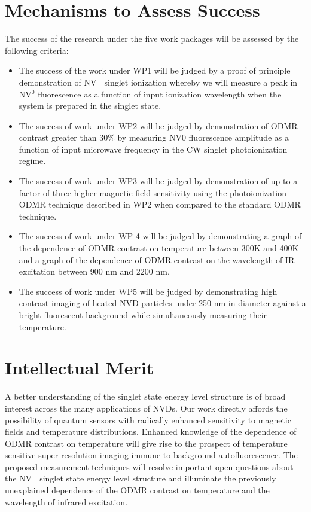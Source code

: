 \documentclass[11pt]{article}
\begin{document}
\section{Mechanisms to Assess Success}
The success of the research under the five work packages will be assessed by the following criteria:
\begin{itemize}
\item The success of the work under WP1 will be judged by a proof of principle demonstration of NV$^-$ singlet ionization whereby we will measure a peak in NV$^0$ fluorescence as a function of input ionization wavelength when the system is prepared in the singlet state.
\item The success of work under WP2 will be judged by demonstration of ODMR contrast greater than 30\% by measuring NV0 fluorescence amplitude as a function of input microwave frequency in the CW singlet photoionization regime.
\item The success of work under WP3 will be judged by demonstration of up to a factor of three higher magnetic field sensitivity using the photoionization ODMR technique described in WP2 when compared to the standard ODMR technique.
\item The success of work under WP 4 will be judged by demonstrating a graph of the dependence of ODMR contrast on temperature between 300K and 400K and a graph of the dependence of ODMR contrast on the wavelength of IR excitation between 900 nm and 2200 nm.
\item The success of work under WP5 will be judged by demonstrating high contrast imaging of heated NVD particles under 250 nm in diameter against a bright fluorescent background while simultaneously measuring their temperature.
\end{itemize}

\section{Intellectual Merit}
A better understanding of the singlet state energy level structure is of broad interest 
across the many applications of NVDs. Our work directly affords the possibility of quantum 
sensors with radically enhanced sensitivity to magnetic fields and temperature 
distributions.  Enhanced knowledge of the dependence of ODMR contrast on temperature will 
give rise to the prospect of temperature sensitive super-resolution imaging immune to 
background autofluorescence. The proposed measurement techniques will resolve important 
open questions about the NV$^-$ singlet state energy level structure and illuminate the 
previously unexplained dependence of the ODMR contrast on temperature and the wavelength of 
infrared excitation.
\end{document}
